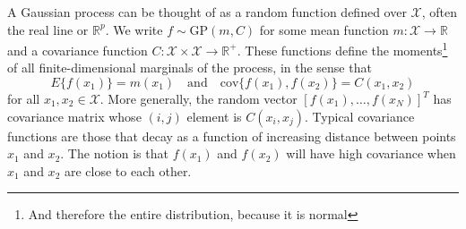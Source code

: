 \documentclass[11pt]{article}
\begin{document}
A Gaussian process can be thought of as a random function defined over $\mathcal{X}$, often the real line or $\mathbb{R}^p$.  We write $f \sim \mbox{GP}(m, C)$ for some mean function $m: \mathcal{X} \rightarrow \mathbb{R}$ and a covariance function $C: \mathcal{X} \times \mathcal{X} \rightarrow \mathbb{R}^+$.  These functions define the moments\footnote{And therefore the entire distribution, because it is normal} of all finite-dimensional marginals of the process, in the sense that
$$
E\{ f(x_1) \} = m(x_1) \quad \mbox{and} \quad \mbox{cov}\{f(x_1), f(x_2) \} = C(x_1, x_2)
$$
for all $x_1, x_2 \in \mathcal{X}$.  More generally, the random vector $[f(x_1), \ldots, f(x_N)]^T$ has covariance matrix whose $(i,j)$ element is $C(x_i, x_j)$.  Typical covariance functions are those that decay as a function of increasing distance between points $x_1$ and $x_2$.  The notion is that $f(x_1)$ and $f(x_2)$ will have high covariance when $x_1$ and $x_2$ are close to each other.
\end{document}

